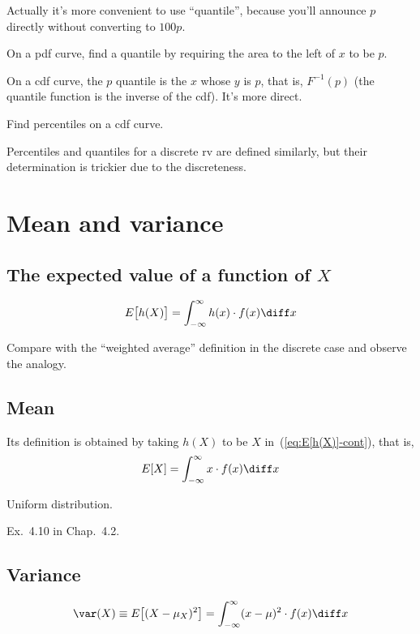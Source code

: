 \documentclass[12pt]{article}
\begin{document}
Actually it's more convenient to use ``quantile'',
because you'll announce $p$ directly without converting to $100p$.

On a pdf curve, find a quantile by requiring the area to the left of $x$
to be $p$.

On a cdf curve, the $p$ quantile is the $x$ whose $y$ is $p$, that is,
$F^{-1}(p)$ (the quantile function is the inverse of the cdf).
It's more direct.

\example Find percentiles on a cdf curve.

\note Percentiles and quantiles for a discrete rv are defined similarly,
but their determination is trickier due to the discreteness.


\section{Mean and variance}

\subsection{The expected value of a function of $X$}

\begin{equation}\label{eq:E[h(X)]-cont}
E\bigl[h(X)\bigr]
= \int_{-\infty}^\infty h(x) \cdot f(x) \diff x
\end{equation}

\exercise Compare with the ``weighted average'' definition
in the discrete case and observe the analogy.

\subsection{Mean}

Its definition is obtained by taking $h(X)$ to be $X$
in~(\ref{eq:E[h(X)]-cont}), that is,
\[
E[X]
= \int_{-\infty}^{\infty} x \cdot f(x) \diff x
\]

\example
Uniform distribution.

\example
Ex.~4.10 in Chap.~4.2.

\subsection{Variance}

\begin{equation}\label{eq:var-def-cont}
\var(X)
\equiv E\bigl[(X - \mu_X)^2\bigr]
= \int_{-\infty}^{\infty} (x - \mu)^2 \cdot f(x) \diff x
\end{equation}
\end{document}
